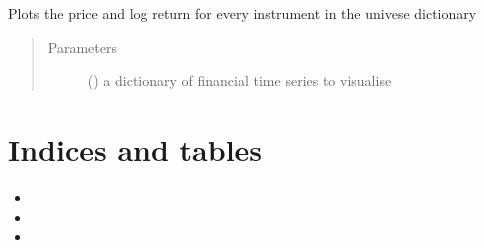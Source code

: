 \documentclass[letterpaper,10pt,english]{sphinxmanual}
\begin{document}
\begin{fulllineitems}
\label{\detokenize{index:Src.utils.visualise_universe}}
Plots the price and log return for every
instrument in the univese dictionary
\begin{quote}\begin{description}
\item[{Parameters}] \leavevmode
{} () \textendash{} a dictionary of financial time series to visualise

\end{description}\end{quote}

\end{fulllineitems}



\section{Indices and tables}
\label{\detokenize{index:indices-and-tables}}\begin{itemize}
\item {} 

\item {} 

\item {} 

\end{itemize}


\renewcommand{\indexname}{Python Module Index}
\begin{sphinxtheindex}
\let\bigletter\sphinxstyleindexlettergroup
\bigletter{s}
\item\relax{}
\item\relax{}
\item\relax{}
\end{sphinxtheindex}

\renewcommand{\indexname}{Index}
\printindex
\end{document}

